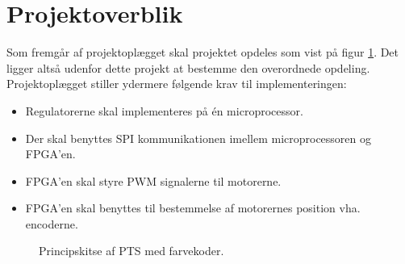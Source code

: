 \section{Projektoverblik}
\label{sec:projektoverblik}

Som fremgår af projektoplægget skal projektet opdeles som vist på 
figur \ref{fig:overview_openloop_PTS}. 
Det ligger altså udenfor dette projekt at bestemme den overordnede opdeling.
Projektoplægget stiller ydermere følgende krav til implementeringen:
\begin{itemize}
\itemsep1pt
  \item Regulatorerne skal implementeres på én microprocessor.
  \item Der skal benyttes SPI kommunikationen imellem microprocessoren og FPGA’en.
  \item FPGA’en skal styre PWM signalerne til motorerne.
  \item FPGA’en skal benyttes til bestemmelse af motorernes position vha. encoderne.
\end{itemize}

\bigskip

\begin{figure}[!th]
\centering
\begin{tikzpicture}[auto, node distance=1cm,>=latex']

\end{tikzpicture}
\caption[Principskitse af PTS]{Principskitse af PTS med farvekoder.}
\label{fig:overview_openloop_PTS}
\end{figure}
